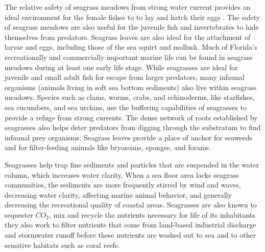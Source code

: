 \documentclass[12pt]{report}   %
\begin{document}
The relative safety of seagrass meadows from strong water current provides an ideal environment for the female fishes to to lay and hatch their eggs \cite{rooker98}. The safety of seagrass meadows are also useful for the juvenile fish and invertebrates to hide themselves from predators. Seagrass leaves are also ideal for the attachment of larvae and eggs, including those of the sea squirt and mollusk. Much of Florida's recreationally and commercially important marine life can be found in seagrass meadows during at least one early life stage. While seagrasses are ideal for juvenile and small adult fish for escape from larger predators, many infaunal organisms (animals living in soft sea bottom sediments) also live within seagrass meadows. Species such as clams, worms, crabs, and echinoderms, like starfishes, sea cucumbers, and sea urchins, use the buffering capabilities of seagrasses to provide a refuge from strong currents. The dense network of roots established by seagrasses also helps deter predators from 
digging through the substratum to find 
infaunal prey organisms. Seagrass leaves provide a place of anchor for seaweeds and for filter-feeding animals like bryozoans, sponges, and forams.

Seagrasses help trap fine sediments and particles that are suspended in the water column, which increases water clarity. When a sea floor area lacks seagrass communities, the sediments are more frequently stirred by wind and waves, decreasing water clarity, affecting marine animal behavior, and generally decreasing the recreational quality of coastal areas. Seagrasses are also known to sequester $C O_2$\cite{duarte2005}, mix and recycle the nutrients necessary for life of its inhabitants they also work to filter nutrients that come from land-based industrial discharge and stormwater runoff before these nutrients are washed out to sea and to other sensitive habitats such as coral reefs.
\end{document}
